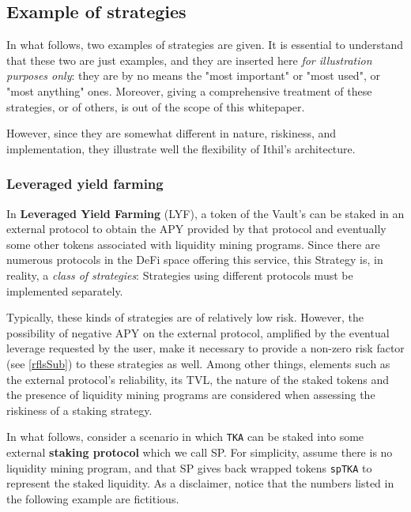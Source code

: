 \documentclass[a4paper,10 pt]{article}
\theoremstyle{definition}
\begin{document}
\subsection{Example of strategies}\label{exstrSub}

In what follows, two examples of strategies are given. It is essential to understand that these two are just examples, and they are inserted here {\it for illustration purposes only}: they are by no means the "most important" or "most used", or "most anything" ones. Moreover, giving a comprehensive treatment of these strategies, or of others, is out of the scope of this whitepaper. 

However, since they are somewhat different in nature, riskiness, and implementation, they illustrate well the flexibility of Ithil's architecture.
 
\subsubsection{Leveraged yield farming}\label{lyfSubSub}

In {\bf Leveraged Yield Farming} (LYF), a token of the Vault's can be staked in an external protocol to obtain the APY provided by that protocol and eventually some other tokens associated with liquidity mining programs. Since there are numerous protocols in the DeFi space offering this service, this Strategy is, in reality, a {\it class of strategies}: Strategies using different protocols must be implemented separately.

Typically, these kinds of strategies are of relatively low risk. However, the possibility of negative APY on the external protocol, amplified by the eventual leverage requested by the user, make it necessary to provide a non-zero risk factor (see \ref{rflsSub}) to these strategies as well. Among other things, elements such as the external protocol's reliability, its TVL, the nature of the staked tokens and the presence of liquidity mining programs are considered when assessing the riskiness of a staking strategy.

In what follows, consider a scenario in which \verb|TKA| can be staked into some external {\bf staking protocol} which we call SP. For simplicity, assume there is no liquidity mining program, and that SP gives back wrapped tokens \verb|spTKA| to represent the staked liquidity. As a disclaimer, notice that the numbers listed in the following example are fictitious.
\end{document}
